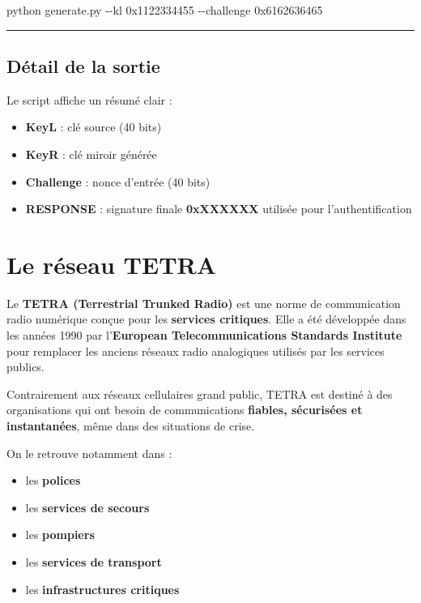 \documentclass[
  french,
]{article}
\newenvironment{Shaded}{\begin{snugshade}}{\end{snugshade}}
\newcommand{\AttributeTok}[1]{\textcolor[rgb]{0.13,0.29,0.53}{#1}}
\newcommand{\ExtensionTok}[1]{#1}
\newcommand{\NormalTok}[1]{#1}
\providecommand{\tightlist}{%
  \setlength{\itemsep}{0pt}\setlength{\parskip}{0pt}}
\begin{document}
\begin{Shaded}
\begin{Highlighting}[]
\ExtensionTok{python}\NormalTok{ generate.py }\AttributeTok{{-}{-}kl}\NormalTok{ 0x1122334455 }\AttributeTok{{-}{-}challenge}\NormalTok{ 0x6162636465}
\end{Highlighting}
\end{Shaded}

\begin{center}\rule{0.5\linewidth}{0.5pt}\end{center}

\subsection{Détail de la sortie}\label{duxe9tail-de-la-sortie}

Le script affiche un résumé clair :

\begin{itemize}
\tightlist
\item
  \textbf{KeyL} : clé source (40 bits)
\item
  \textbf{KeyR} : clé miroir générée
\item
  \textbf{Challenge} : nonce d'entrée (40 bits)
\item
  \textbf{RESPONSE} : signature finale \textbf{0xXXXXXX} utilisée pour
  l'authentification
\end{itemize}

\section{Le réseau TETRA}\label{le-ruxe9seau-tetra}

Le \textbf{TETRA (Terrestrial Trunked Radio)} est une norme de
communication radio numérique conçue pour les \textbf{services
critiques}. Elle a été développée dans les années 1990 par
l'\textbf{European Telecommunications Standards Institute} pour
remplacer les anciens réseaux radio analogiques utilisés par les
services publics.

Contrairement aux réseaux cellulaires grand public, TETRA est destiné à
des organisations qui ont besoin de communications \textbf{fiables,
sécurisées et instantanées}, même dans des situations de crise.

On le retrouve notamment dans :

\begin{itemize}
\tightlist
\item
  les \textbf{polices}
\item
  les \textbf{services de secours}
\item
  les \textbf{pompiers}
\item
  les \textbf{services de transport}
\item
  les \textbf{infrastructures critiques}
\end{itemize}
\end{document}
